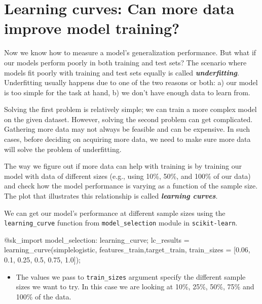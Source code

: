 \documentclass[
  letterpaper,
]{book}
\newenvironment{Shaded}{\begin{snugshade}}{\end{snugshade}}
\newcommand{\FloatTok}[1]{\textcolor[rgb]{0.68,0.00,0.00}{#1}}
\newcommand{\FunctionTok}[1]{\textcolor[rgb]{0.28,0.35,0.67}{#1}}
\newcommand{\NormalTok}[1]{\textcolor[rgb]{0.00,0.23,0.31}{#1}}
\newcommand{\OperatorTok}[1]{\textcolor[rgb]{0.37,0.37,0.37}{#1}}
\newcommand{\PreprocessorTok}[1]{\textcolor[rgb]{0.68,0.00,0.00}{#1}}
\providecommand{\tightlist}{%
  \setlength{\itemsep}{0pt}\setlength{\parskip}{0pt}}\usepackage{longtable,booktabs,array}
\begin{document}
\hypertarget{learning-curves-can-more-data-improve-model-training}{%
\section{Learning curves: Can more data improve model
training?}\label{learning-curves-can-more-data-improve-model-training}}

Now we know how to measure a model's generalization performance. But
what if our models perform poorly in both training and test sets? The
scenario where models fit poorly with training and test sets equally is
called \textbf{\emph{underfitting}}. Underfitting usually happens due to
one of the two reasons or both: a) our model is too simple for the task
at hand, b) we don't have enough data to learn from.

Solving the first problem is relatively simple; we can train a more
complex model on the given dataset. However, solving the second problem
can get complicated. Gathering more data may not always be feasible and
can be expensive. In such cases, before deciding on acquiring more data,
we need to make sure more data will solve the problem of underfitting.

The way we figure out if more data can help with training is by training
our model with data of different sizes (e.g., using 10\%, 50\%, and
100\% of our data) and check how the model performance is varying as a
function of the sample size. The plot that illustrates this relationship
is called \textbf{\emph{learning curves}}.

We can get our model's performance at different sample sizes using the
\texttt{learning\_curve} function from \texttt{model\_selection} module
in \texttt{scikit-learn}.

\begin{Shaded}
\begin{Highlighting}[]
\PreprocessorTok{@sk\_import}\NormalTok{ model\_selection}\OperatorTok{:}\NormalTok{ learning\_curve;}
\NormalTok{lc\_results }\OperatorTok{=} \FunctionTok{learning\_curve}\NormalTok{(simplelogistic, }
\NormalTok{        features\_train,target\_train, }
\NormalTok{            train\_sizes }\OperatorTok{=}\NormalTok{ [}\FloatTok{0.06}\NormalTok{, }\FloatTok{0.1}\NormalTok{, }\FloatTok{0.25}\NormalTok{, }\FloatTok{0.5}\NormalTok{, }\FloatTok{0.75}\NormalTok{, }\FloatTok{1.0}\NormalTok{]);}
\end{Highlighting}
\end{Shaded}

\begin{itemize}
\tightlist
\item
  The values we pass to \texttt{train\_sizes} argument specify the
  different sample sizes we want to try. In this case we are looking at
  10\%, 25\%, 50\%, 75\% and 100\% of the data.
\end{itemize}
\end{document}
